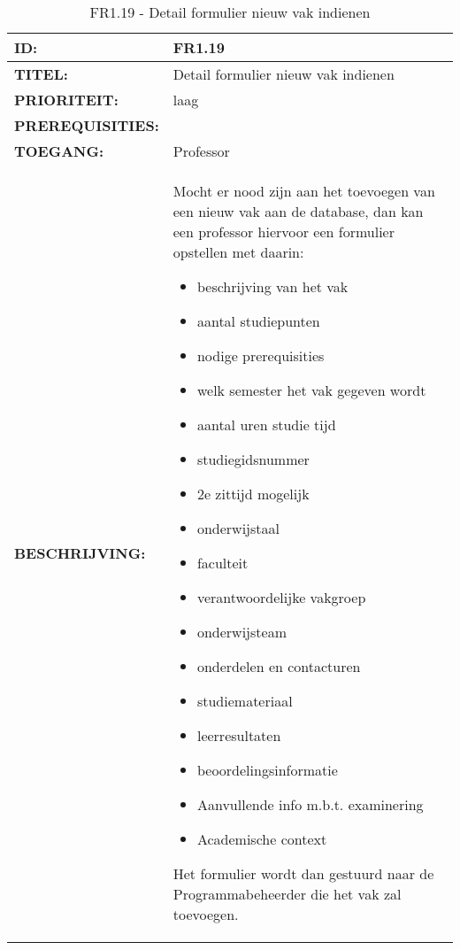 \noindent\begin{table}[H]
            \begin{tabular}{l | p{10cm}} 
                \textbf{ID:} & FR1.19 \\ \hline
                \textbf{TITEL:} & Detail formulier nieuw vak indienen\\ \hline
                \textbf{PRIORITEIT:} &  laag \\ \hline
                \textbf{PREREQUISITIES:} & \\ \hline
                \textbf{TOEGANG:} & Professor \\ \hline
                \textbf{BESCHRIJVING:} & Mocht er nood zijn aan het toevoegen van een nieuw vak aan de database, dan kan een professor hiervoor een formulier opstellen met daarin:
        \begin{itemize}\itemsep1pt \parskip0pt \parsep0pt
                                        \item beschrijving van het vak
                                        \item aantal studiepunten
                                        \item nodige prerequisities
                                        \item welk semester het vak gegeven wordt
                                        \item aantal uren studie tijd
                                        \item studiegidsnummer
                                        \item 2e zittijd mogelijk
                                        \item onderwijstaal
                                        \item faculteit
                                        \item verantwoordelijke vakgroep
                                        \item onderwijsteam
                                        \item onderdelen en contacturen
                                        \item studiemateriaal
                                        \item leerresultaten
                                        \item beoordelingsinformatie
                                        \item Aanvullende info m.b.t. examinering
                                        \item Academische context
                                        \end{itemize}
                                        Het formulier wordt dan gestuurd naar de Programmabeheerder die het vak zal toevoegen. 
            \end{tabular}\\
            \caption{FR1.19 - Detail formulier nieuw vak indienen}
            \label{tab:FR1.19 - Detail formulier nieuw vak indienen}
        \end{table}

